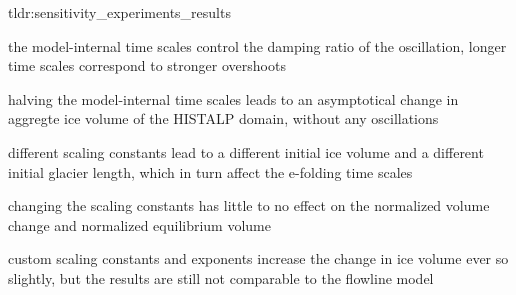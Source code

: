     \begin{tldrbox}{tldr:sensitivity_experiments_results}
      \item the model-internal time scales control the damping ratio of the oscillation, longer time scales correspond to stronger overshoots
      \item halving the model-internal time scales leads to an asymptotical change in aggregte ice volume of the HISTALP domain, without any oscillations
      \item different scaling constants lead to a different initial ice volume and a different initial glacier length, which in turn affect the e-folding time scales
      \item changing the scaling constants has little to no effect on the normalized volume change and normalized equilibrium volume
      \item custom scaling constants and exponents increase the change in ice volume ever so slightly, but the results are still not comparable to the flowline model
    \end{tldrbox}
    

